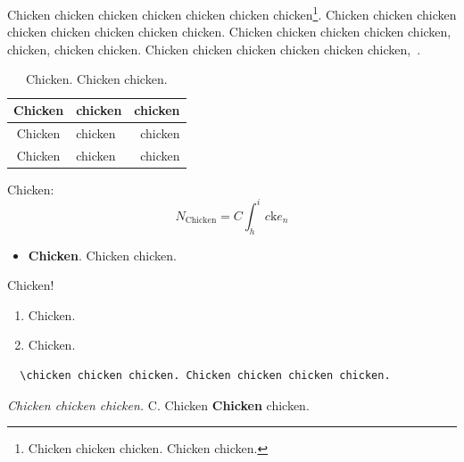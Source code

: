 \documentclass[a4paper,10pt]{article}
\begin{document}
Chicken chicken chicken chicken chicken chicken chicken\footnote{Chicken chicken chicken. Chicken chicken.}. Chicken chicken chicken chicken chicken chicken chicken chicken.
Chicken chicken chicken chicken chicken, chicken, chicken chicken. Chicken chicken chicken chicken chicken chicken,~\cite{Chicken}.

\begin{table}[H]\begin{center}
    \caption{Chicken. Chicken chicken.}
    \begin{tabular}{c|||l|||r}
	\hline
	Chicken & chicken & chicken\\\hline
	Chicken & chicken & chicken\\\hline
	Chicken & chicken & chicken\\\hline
    \end{tabular}

\end{center}\end{table}

Chicken:
\begin{equation}
  N_\mathrm{Chicken} = C \int_h^i c\mathrm k e_n
\end{equation}

\begin{itemize}
 \item \textbf{Chicken}. Chicken chicken.
\end{itemize}
Chicken!
\begin{enumerate}
 \item Chicken.
 \item Chicken.
\end{enumerate}

\begin{verbatim}
  \chicken chicken chicken. Chicken chicken chicken chicken.
\end{verbatim}



\begin{thebibliography}{99}

\textit{Chicken chicken chicken.} C. Chicken \textbf{Chicken} chicken.

\end{thebibliography}
\end{document}
